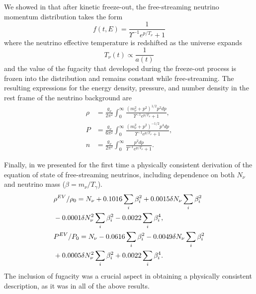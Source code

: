 We showed in \cite{Birrell:2013_2} that after kinetic freeze-out, the free-streaming neutrino momentum distribution takes the form
\begin{equation}\label{neutrino_dist}
f(t,E)=\frac{1}{\Upsilon^{-1}e^{p/T_\nu}+ 1}
\end{equation}
where the neutrino effective temperature is redshifted as the universe expands
\begin{equation}\label{Tneutrino_dist}
T_\nu(t)\propto \frac{1}{a(t)}
\end{equation}
and the value of the fugacity  that developed during the freeze-out process is frozen into the distribution and remains constant while free-streaming. The resulting expressions for the energy density, pressure, and number density in the rest frame of the neutrino background are
\begin{align}
\rho&=\frac{g_\nu}{2\pi^2}\!\int_0^\infty\!\!\frac{\left(m_\nu^2+p^2\right)^{1/2}p^2dp }{\Upsilon^{-1}e^{p/T_\nu}+ 1},\label{neutrino_rho}\\[0.2cm]
P&=\frac{g_\nu}{6\pi^2}\!\int_0^\infty\!\!\frac{\left(m_\nu^2+p^2\right)^{-1/2}p^4dp }{\Upsilon^{-1} e^{p/T_\nu}+ 1},\label{neutrino_P}\\[0.2cm]
n&=\frac{g_\nu}{2\pi^2}\!\int_0^\infty\!\!\!\frac{p^2dp }{\Upsilon^{-1}e^{p/T_\nu}+ 1}.
\label{num_density}
\end{align}

  Finally, in  \cite{Birrell:2013_2} we presented for the first time a  physically consistent derivation of the equation of state of free-streaming neutrinos, including dependence on both $N_\nu$ and neutrino mass ($\beta=m_\nu/T_\gamma$). 
\begin{align}
&\rho^{EV}/\rho_0= N_\nu+0.1016\sum_i\beta_i^2+0.0015\delta N_\nu\sum_i\beta_i^2\notag\\
&-0.0001\delta N_\nu^2\sum_i\beta_i^2-0.0022\sum_i\beta_i^4,\\
&P^{EV}/P_0= N_\nu-0.0616\sum_i\beta_i^2-0.0049\delta N_\nu\sum_i\beta_i^2\notag\\
&+0.0005\delta N_\nu^2\sum_i\beta_i^2+0.0022\sum_i\beta_i^4.\label{tau_Ups}
\end{align}
The inclusion of fugacity was a crucial aspect in obtaining a physically consistent description, as it was in all of the above results.
